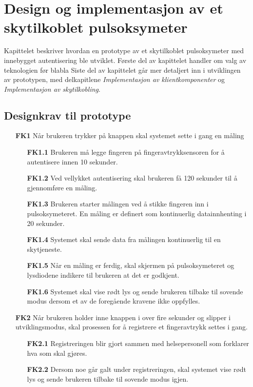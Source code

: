 \chapter{Design og implementasjon av et skytilkoblet pulsoksymeter}
\label{ch:implementation1}

Kapittelet beskriver hvordan en prototype av et skytilkoblet pulsoksymeter med innebygget autentisering ble utviklet.
Første del av kapittelet handler om valg av teknologien før blabla
Siste del av kapittelet går mer detaljert inn i utviklingen av prototypen, med delkapitlene
\textit{Implementasjon av klientkomponenter} og \textit{Implementasjon av skytilkobling}.

\section{Designkrav til prototype}

\begin{enumerate}
    \item [\textbf{FK1}] Når brukeren trykker på knappen skal systemet sette i gang en måling
        \begin{enumerate}
          \item [\textbf{FK1.1}] Brukeren må legge fingeren på fingeravtrykksensoren for å autentisere innen 10 sekunder.
          \item [\textbf{FK1.2}] Ved vellykket autentisering skal brukeren få 120 sekunder til å gjennomføre
              en måling.
          \item [\textbf{FK1.3}] Brukeren starter målingen ved å stikke fingeren inn i pulsoksymeteret.
              En måling er definert som kontinuerlig datainnhenting i 20 sekunder.
          \item [\textbf{FK1.4}] Systemet skal sende data fra målingen kontinuerlig til en skytjeneste.
          \item [\textbf{FK1.5}] Når en måling er ferdig, skal skjermen på pulsoksymeteret og lysdiodene indikere til brukeren
              at det er godkjent.
          \item [\textbf{FK1.6}]Systemet skal vise rødt lys og sende brukeren tilbake til sovende modus dersom et av de
              foregående kravene ikke oppfylles.
        \end{enumerate}
    \item [\textbf{FK2}] Når brukeren holder inne knappen i over fire sekunder og slipper i utviklingsmodus,
        skal prosessen for å registrere et fingeravtrykk settes i gang.
        \begin{enumerate}
          \item [\textbf{FK2.1}] Registreringen blir gjort sammen med helsepersonell som forklarer hva som skal gjøres.
          \item [\textbf{FK2.2}] Dersom noe går galt under registreringen, skal systemet vise rødt lys og sende brukeren
              tilbake til sovende modus igjen.
        \end{enumerate}
\end{enumerate}

